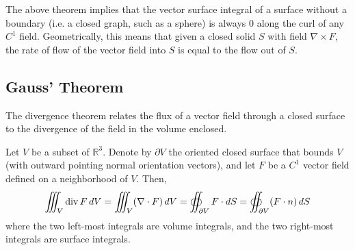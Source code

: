   The above theorem implies that the vector surface integral of a surface without a boundary (i.e. a closed graph, such as a sphere) is always $0$ along the curl of any $C^1$ field. Geometrically, this means that given a closed solid $S$ with field $\nabla \times F$, the rate of flow of the vector field into $S$ is equal to the flow out of $S$. 
		
\subsection{Gauss' Theorem}
		
  The divergence theorem relates the flux of a vector field through a closed surface to the divergence of the field in the volume enclosed. 
		
  \begin{theorem}
    \label{thm:gauss-divergence-theorem}
		Let $V$ be a subset of $\mathbb{R}^3$. Denote by $\partial V$ the oriented closed surface that bounds $V$ (with outward pointing normal orientation vectors), and let $F$ be a $C^1$ vector field defined on a neighborhood of $V$. Then, 
		\begin{equation}
			\iiint_V \operatorname{div}{F} \, d V = \iiint_V (\nabla \cdot F) \, d V = \oiint_{\partial V} F \cdot d S = \oiint_{\partial V} (F \cdot n) \, dS
		\end{equation}
		where the two left-most integrals are volume integrals, and the two right-most integrals are surface integrals. 
		
		\begin{figure}[H]
			\centering 
\end{figure}
\end{theorem}
